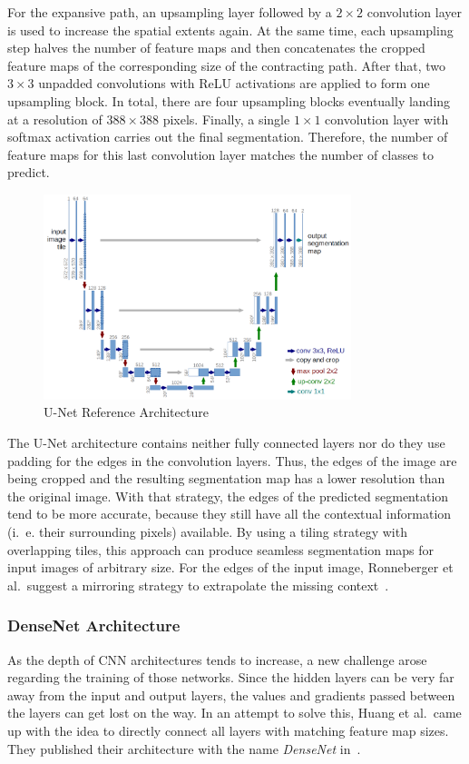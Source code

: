 For the expansive path, an upsampling layer followed by a $2\times 2$ convolution layer is used to increase the spatial extents again. At the same time, each upsampling step halves the number of feature maps and then concatenates the cropped feature maps of the corresponding size of the contracting path. After that, two $3\times 3$ unpadded convolutions with ReLU activations are applied to form one upsampling block. In total, there are four upsampling blocks eventually landing at a resolution of $388\times 388$ pixels. Finally, a single $1\times 1$ convolution layer with softmax activation carries out the final segmentation. Therefore, the number of feature maps for this last convolution layer matches the number of classes to predict.

\begin{figure}[h]
    \centering
    \includegraphics[width=0.8\textwidth]{images/u-net-architecture}
    \caption[U-Net Reference Architecture]{U-Net Reference Architecture~\cite{unet15}}
    \label{fig:unet_architecture}
\end{figure}

The U-Net architecture contains neither fully connected layers nor do they use padding for the edges in the convolution layers. Thus, the edges of the image are being cropped and the resulting segmentation map has a lower resolution than the original image. With that strategy, the edges of the predicted segmentation tend to be more accurate, because they still have all the contextual information (i.~e. their surrounding pixels) available. By using a tiling strategy with overlapping tiles, this approach can produce seamless segmentation maps for input images of arbitrary size. For the edges of the input image, Ronneberger et al.\ suggest a mirroring strategy to extrapolate the missing context~\cite{unet15}.

\subsubsection{DenseNet Architecture}
\label{sec:densenet}
As the depth of CNN architectures tends to increase, a new challenge arose regarding the training of those networks. Since the hidden layers can be very far away from the input and output layers, the values and gradients passed between the layers can get lost on the way. In an attempt to solve this, Huang et al.\ came up with the idea to directly connect all layers with matching feature map sizes. They published their architecture with the name \emph{DenseNet} in~\cite{densenet18}.

